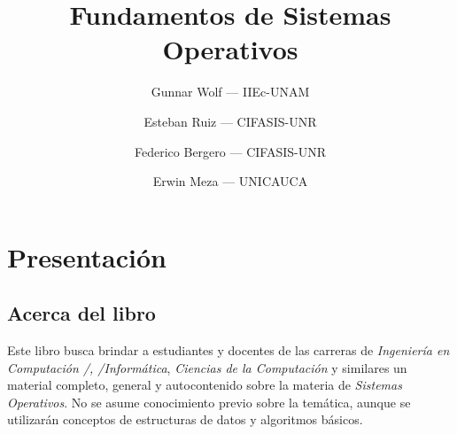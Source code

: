 \documentclass[11pt,fleqn]{book} %
\title{Fundamentos de Sistemas Operativos}
\author{Gunnar Wolf — IIEc-UNAM \and Esteban Ruiz — CIFASIS-UNR \and Federico Bergero — CIFASIS-UNR \and Erwin Meza — UNICAUCA}
\date{}
\begin{document}






\pagestyle{empty} 


\pagestyle{empty} %

\tableofcontents %

\cleardoublepage %

\pagestyle{fancy} %












\chapter{Presentación}

\section{Acerca del libro}

Este libro busca brindar a estudiantes y docentes de las carreras de
\emph{Ingeniería en Computación /, /Informática}, \emph{Ciencias de la Computación} y similares un material completo, general y autocontenido
sobre la materia de \emph{Sistemas Operativos}. No se asume conocimiento
previo sobre la temática, aunque se utilizarán conceptos de
estructuras de datos y algoritmos básicos.
\end{document}
